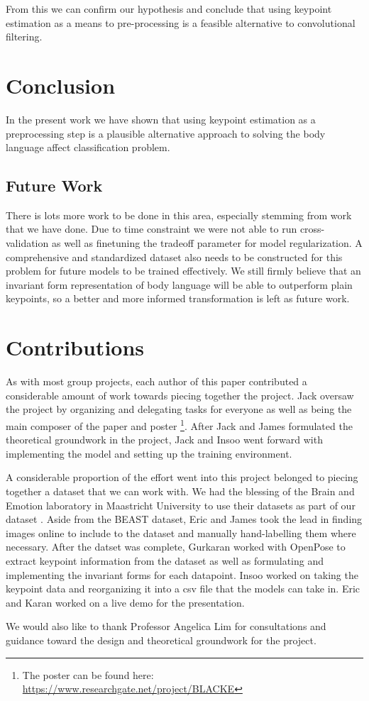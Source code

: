 \documentclass{article}
\begin{document}
From this we can confirm our hypothesis and conclude that using keypoint estimation as a means to pre-processing is a feasible alternative to convolutional filtering.

\section{Conclusion}

In the present work we have shown that using keypoint estimation as a preprocessing step is a plausible alternative approach to solving the body language affect classification problem.

\subsection{Future Work}

There is lots more work to be done in this area, especially stemming from work that we have done. Due to time constraint we were not able to run cross-validation as well as finetuning the tradeoff parameter for model regularization. A comprehensive and standardized dataset also needs to be constructed for this problem for future models to be trained effectively. We still firmly believe that an invariant form representation of body language will be able to outperform plain keypoints, so a better and more informed transformation is left as future work.

\section{Contributions}

As with most group projects, each author of this paper contributed a considerable amount of work towards piecing together the project. Jack oversaw the project by organizing and delegating tasks for everyone as well as being the main composer of the paper and poster \footnote{The poster can be found here: \url{https://www.researchgate.net/project/BLACKE}}. After Jack and James formulated the theoretical groundwork in the project, Jack and Insoo went forward with implementing the model and setting up the training environment.

A considerable proportion of the effort went into this project belonged to piecing together a dataset that we can work with. We had the blessing of the Brain and Emotion laboratory in Maastricht University to use their datasets as part of our dataset \citep{de2011bodily}\citep{stienen2012computational}. Aside from the BEAST dataset, Eric and James took the lead in finding images online to include to the dataset and manually hand-labelling them where necessary. After the datset was complete, Gurkaran worked with OpenPose to extract keypoint information from the dataset as well as formulating and implementing the invariant forms for each datapoint. Insoo worked on taking the keypoint data and reorganizing it into a csv file that the models can take in. Eric and Karan worked on a live demo for the presentation.

We would also like to thank Professor Angelica Lim for consultations and guidance toward the design and theoretical groundwork for the project.



\end{document}
